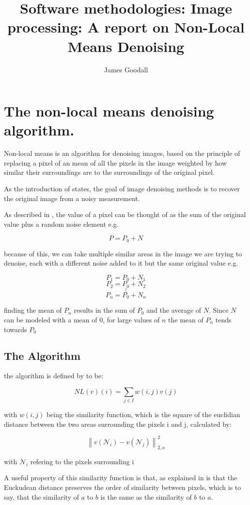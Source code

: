 \documentclass[11pt]{article}
\title{Software methodologies: Image processing: A report on Non-Local Means Denoising}
\author{James Goodall}
\begin{document}
\maketitle
\section{The non-local means denoising algorithm.}

Non-local means is an algorithm for denoising images, based on the principle of replacing a pixel of an mean of all the pixels in the image weighted by how similar their surroundings are to the surroundings of the original pixel. 

As the introduction of \cite{anlafid} states, the goal of image denoising methods is to recover the original image from a noisy measurement.

As described in \cite{dip20}, the value of a pixel can be thought of as the sum of the original value plus a random noise element e.g.

\[P = P_0 + N\]

because of this, we can take multiple similar areas in the image we are trying to denoise, each with a different noise added to it but the same original value e.g.

\[P_1 = P_0 + N_1\]
\[P_2 = P_0 + N_2\]
\[\vdots\]
\[P_n = P_0 + N_n\]

finding the mean of $P_n$ results in the sum of $P_0$ and the average of $N$. Since $N$ can be modeled with a mean of $0$, for large values of $n$ the mean of $P_n$ tends towards $P_0$

\subsection{The Algorithm} \label{algorithm}

the algorithm is defined by \cite{Buades_2005} to be: 

\[NL(v)(i) = \sum_{j \in I}{w(i,j)v(j)}\]

with $w(i,j)$ being the similarity function, which is the square of the euclidian distance between the two areas surrounding the pixels i and j, calculated by:

\[\left\|v\left(\mathcal{N}_{i}\right)-v\left(\mathcal{N}_{j}\right)\right\|_{2, a}^{2}\]

with $\mathcal{N}_i$ refering to the pixels surrounding i

A useful property of this similarity function is that, as explained in \cite{Buades_2005} is that the Euckudean distance preserves the order of similarity between pixels, which is to say, that the similarity of $a$ to $b$ is the same as the similarity of $b$ to $a$.
\end{document}
